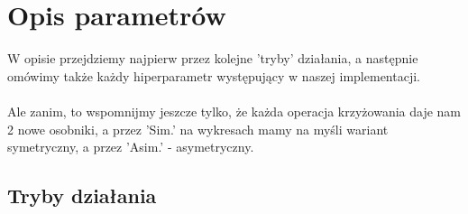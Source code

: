 \documentclass{article}
\begin{document}
\section{Opis parametrów}
W opisie przejdziemy najpierw przez kolejne 'tryby' działania, a następnie omówimy także każdy hiperparametr występujący w naszej implementacji. \\\\

Ale zanim, to wspomnijmy jeszcze tylko, że każda operacja krzyżowania daje nam 2 nowe osobniki, a przez 'Sim.' na wykresach mamy na myśli wariant symetryczny, a przez 'Asim.' - asymetryczny.

\subsection{Tryby działania}
\end{document}
